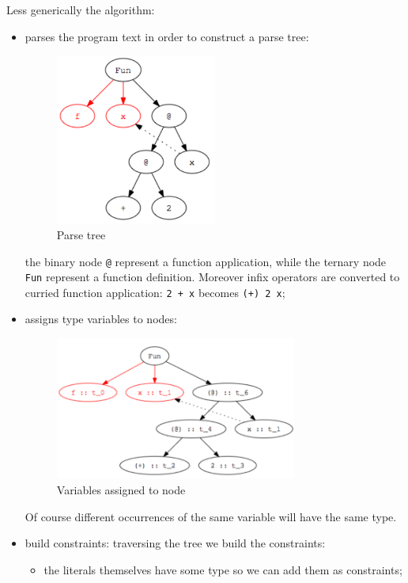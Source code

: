 Less generically the algorithm:
\begin{itemize}
    \item parses the program text in order to construct a parse tree:
    \begin{figure}[H]
        \centering
        \includegraphics[width=200px]{images/7_Functional_Programming/type_inference_algorithm_1.png}
        \caption{Parse tree}
    \end{figure}
    the binary node \verb|@| represent a function application, while the ternary node \verb|Fun| represent a function definition.
    Moreover infix operators are converted to curried function application: \verb|2 + x| becomes \verb|(+) 2 x|;

    \item assigns type variables to nodes:
    \begin{figure}[H]
        \centering
        \includegraphics[width=300px]{images/7_Functional_Programming/type_inference_algorithm_2.png}
        \caption{Variables assigned to node}
    \end{figure}
    Of course different occurrences of the same variable will have the same type.

    \item build constraints:
    traversing the tree we build the constraints:
    \begin{itemize}
        \item the literals themselves have some type so we can add them as constraints;


\end{itemize}
\end{itemize}
